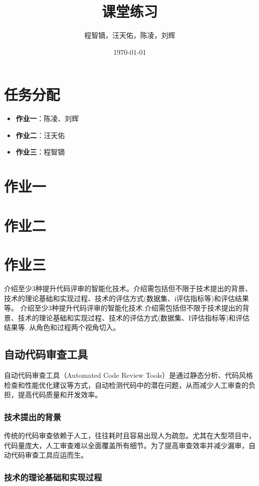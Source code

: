 \documentclass{article}
\title{课堂练习}
\author{程智镝，汪天佑，陈凌，刘辉}
\date{\today}
\begin{document}
\maketitle
\section*{任务分配}
\begin{itemize}
    \item \textbf{作业一}：陈凌、刘辉
    \item \textbf{作业二}：汪天佑
    \item \textbf{作业三}：程智镝
\end{itemize}
\section{作业一}
\section{作业二}
\section{作业三}
介绍至少3种提升代码评审的智能化技术。介绍需包括但不限于技术提出的背景、技术的理论基础和实现过程、技术的评估方式(数据集、i评估指标等)和评估结果等。
介绍至少3种提升代码评审的智能化技术.介绍需包括但不限于技术提出的背景、技术的理论基础和实现过程、技术的评估方式(数据集、I评估指标等)和评估结果等.
从角色和过程两个视角切入。

\subsection{自动代码审查工具}

自动代码审查工具（Automated Code Review Tools）是通过静态分析、代码风格检查和性能优化建议等方式，自动检测代码中的潜在问题，从而减少人工审查的负担，提高代码质量和开发效率。

\subsubsection{技术提出的背景}

传统的代码审查依赖于人工，往往耗时且容易出现人为疏忽。尤其在大型项目中，代码量庞大，人工审查难以全面覆盖所有细节。为了提高审查效率并减少漏审，自动代码审查工具应运而生。

\subsubsection{技术的理论基础和实现过程}
\end{document}
